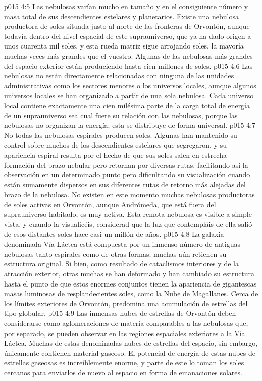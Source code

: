 \vs p015 4:5 \pc Las nebulosas varían mucho en tamaño y en el consiguiente número y masa total de sus descendientes estelares y planetarios. Existe una nebulosa productora de soles situada justo al norte de las fronteras de Orvontón, aunque todavía dentro del nivel espacial de este suprauniverso, que ya ha dado origen a unos cuarenta mil soles, y esta rueda matriz sigue arrojando soles, la mayoría muchas veces más grandes que el vuestro. Algunas de las nebulosas más grandes del espacio exterior están produciendo hasta cien millones de soles.
\vs p015 4:6 Las nebulosas no están directamente relacionadas con ninguna de las unidades administrativas como los sectores menores o los universos locales, aunque algunos universos locales se han organizado a partir de una sola nebulosa. Cada universo local contiene exactamente una cien milésima parte de la carga total de energía de un suprauniverso sea cual fuere su relación con las nebulosas, porque las nebulosas no organizan la energía; esta se distribuye de forma universal.
\vs p015 4:7 No todas las nebulosas espirales producen soles. Algunas han mantenido su control sobre muchos de los descendientes estelares que segregaron, y su apariencia espiral resulta por el hecho de que sus soles salen en estrecha formación del brazo nebular pero retornan por diversas rutas, facilitando así la observación en un determinado punto pero dificultando su visualización cuando están sumamente dispersos en sus diferentes rutas de retorno más alejadas del brazo de la nebulosa. No existen en este momento muchas nebulosas productoras de soles activas en Orvontón, aunque Andrómeda, que está fuera del suprauniverso habitado, es muy activa. Esta remota nebulosa es visible a simple vista, y cuando la visualicéis, considerad que la luz que contempláis de ella salió de esos distantes soles hace casi un millón de años.
\vs p015 4:8 La galaxia denominada Vía Láctea está compuesta por un inmenso número de antiguas nebulosas tanto espirales como de otras formas; muchas aún retienen su estructura original. Si bien, como resultado de cataclismos interiores y de la atracción exterior, otras muchas se han deformado y han cambiado su estructura hasta el punto de que estos enormes conjuntos tienen la apariencia de gigantescas masas luminosas de resplandecientes soles, como la Nube de Magallanes. Cerca de los límites exteriores de Orvontón, predomina una acumulación de estrellas del tipo globular.
\vs p015 4:9 Las inmensas nubes de estrellas de Orvontón deben considerarse como aglomeraciones de materia comparables a las nebulosas que, por separado, se pueden observar en las regiones espaciales exteriores a la Vía Láctea. Muchas de estas denominadas nubes de estrellas del espacio, sin embargo, únicamente contienen material gaseoso. El potencial de energía de estas nubes de estrellas gaseosas es increíblemente enorme, y parte de este lo toman los soles cercanos para enviarlos de nuevo al espacio en forma de emanaciones solares.
